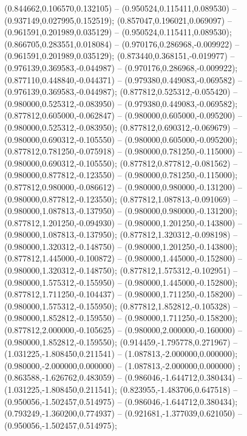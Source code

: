  (0.844662,0.106570,0.132105) -- (0.950524,0.115411,0.089530) -- (0.937149,0.027995,0.152519);
 (0.857047,0.196021,0.069097) -- (0.961591,0.201989,0.035129) -- (0.950524,0.115411,0.089530);
 (0.866705,0.283551,0.018084) -- (0.970176,0.286968,-0.009922) -- (0.961591,0.201989,0.035129);
 (0.873440,0.368151,-0.019977) -- (0.976139,0.369583,-0.044987) -- (0.970176,0.286968,-0.009922);
 (0.877110,0.448840,-0.044371) -- (0.979380,0.449083,-0.069582) -- (0.976139,0.369583,-0.044987);
 (0.877812,0.525312,-0.055420) -- (0.980000,0.525312,-0.083950) -- (0.979380,0.449083,-0.069582);
 (0.877812,0.605000,-0.062847) -- (0.980000,0.605000,-0.095200) -- (0.980000,0.525312,-0.083950);
 (0.877812,0.690312,-0.069679) -- (0.980000,0.690312,-0.105550) -- (0.980000,0.605000,-0.095200);
 (0.877812,0.781250,-0.075918) -- (0.980000,0.781250,-0.115000) -- (0.980000,0.690312,-0.105550);
 (0.877812,0.877812,-0.081562) -- (0.980000,0.877812,-0.123550) -- (0.980000,0.781250,-0.115000);
 (0.877812,0.980000,-0.086612) -- (0.980000,0.980000,-0.131200) -- (0.980000,0.877812,-0.123550);
 (0.877812,1.087813,-0.091069) -- (0.980000,1.087813,-0.137950) -- (0.980000,0.980000,-0.131200);
 (0.877812,1.201250,-0.094930) -- (0.980000,1.201250,-0.143800) -- (0.980000,1.087813,-0.137950);
 (0.877812,1.320312,-0.098198) -- (0.980000,1.320312,-0.148750) -- (0.980000,1.201250,-0.143800);
 (0.877812,1.445000,-0.100872) -- (0.980000,1.445000,-0.152800) -- (0.980000,1.320312,-0.148750);
 (0.877812,1.575312,-0.102951) -- (0.980000,1.575312,-0.155950) -- (0.980000,1.445000,-0.152800);
 (0.877812,1.711250,-0.104437) -- (0.980000,1.711250,-0.158200) -- (0.980000,1.575312,-0.155950);
 (0.877812,1.852812,-0.105328) -- (0.980000,1.852812,-0.159550) -- (0.980000,1.711250,-0.158200);
 (0.877812,2.000000,-0.105625) -- (0.980000,2.000000,-0.160000) -- (0.980000,1.852812,-0.159550);
 (0.914459,-1.795778,0.271967) -- (1.031225,-1.808450,0.211541) -- (1.087813,-2.000000,0.000000);
 (0.980000,-2.000000,0.000000) -- (1.087813,-2.000000,0.000000) ;
 (0.863588,-1.626762,0.483059) -- (0.986046,-1.644712,0.380434) -- (1.031225,-1.808450,0.211541);
 (0.823955,-1.483706,0.647518) -- (0.950056,-1.502457,0.514975) -- (0.986046,-1.644712,0.380434);
 (0.793249,-1.360200,0.774937) -- (0.921681,-1.377039,0.621050) -- (0.950056,-1.502457,0.514975);
